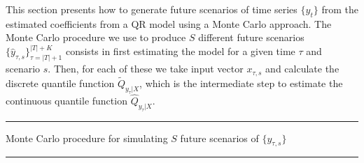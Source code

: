 This section presents how to generate future scenarios of time series $\{y_t\}$ from the estimated coefficients from a QR model using a Monte Carlo approach. 
The Monte Carlo procedure we use to produce $S$ different future scenarios $\{ \hat{y}_{\tau,s} \}_{\tau=|T|+1}^{|T|+K}$ consists in first estimating the model for a given time $\tau$ and scenario $s$. Then, for each of these we take input vector $x_{\tau,s}$ and calculate the discrete quantile function $\tilde{Q}_{y_{\tau}|X}$, which is the intermediate step to estimate the continuous quantile function $\hat{Q}_{y_{\tau}|X}$. 

\noindent\rule{\columnwidth}{1pt}

Monte Carlo procedure for simulating $S$ future scenarios of $\{y_{\tau,s}\}$

\noindent\rule{\columnwidth}{1pt}

